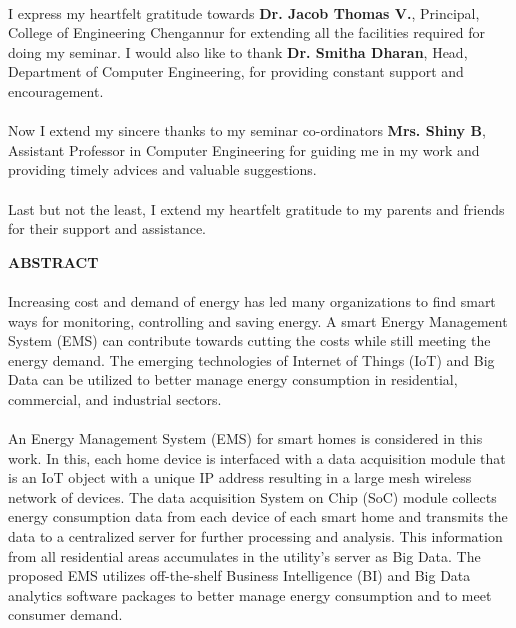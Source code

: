 \documentclass[a4paper,12pt,oneside]{article}
\begin{document}
\paragraph{}
I express my heartfelt gratitude towards \textbf{Dr. Jacob Thomas V.}, Principal, College
of Engineering Chengannur for extending all the facilities required for doing my seminar.
I would also like to thank \textbf{Dr. Smitha Dharan}, Head, Department of Computer
Engineering, for providing constant support and encouragement.
\paragraph{}
Now I extend my sincere thanks to my seminar co-ordinators \textbf{Mrs. Shiny B}, Assistant
Professor in Computer Engineering for guiding me in my work and providing timely
advices and valuable suggestions.
\paragraph{}
Last but not the least, I extend my heartfelt gratitude to my parents and friends for
their support and assistance.	

\newpage
\begin{center}
\large{\textbf{ABSTRACT}}
\end{center}
\vspace{4ex}
\paragraph{}
Increasing cost and demand of energy has led many
organizations to find smart ways for monitoring, controlling and
saving energy. A smart Energy Management System (EMS) can
contribute towards cutting the costs while still meeting the energy
demand. The emerging technologies of Internet of Things (IoT)
and Big Data can be utilized to better manage energy
consumption in residential, commercial, and industrial sectors.
\paragraph{}
An Energy Management System (EMS) for smart homes is considered in this work. In this, each home device is interfaced with
a data acquisition module that is an IoT object with a unique IP
address resulting in a large mesh wireless network of devices.
The data acquisition System on Chip (SoC) module collects
energy consumption data from each device of each smart home
and transmits the data to a centralized server for further
processing and analysis. This information from all residential
areas accumulates in the utility’s server as Big Data. The
proposed EMS utilizes off-the-shelf Business Intelligence (BI) and
Big Data analytics software packages to better manage energy
consumption and to meet consumer demand.
\setlength{\baselineskip}{1.0\baselineskip}
\end{document}
